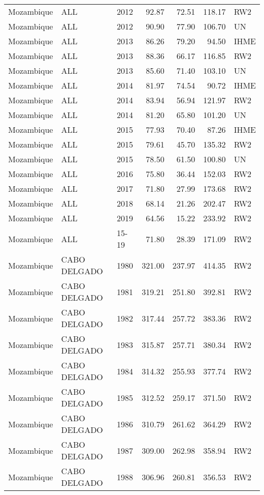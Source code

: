 \begin{longtable}{lllrrrl}
  Mozambique & ALL & 2012 & 92.87 & 72.51 & 118.17 & RW2 \\ 
  Mozambique & ALL & 2012 & 90.90 & 77.90 & 106.70 & UN \\ 
  Mozambique & ALL & 2013 & 86.26 & 79.20 & 94.50 & IHME \\ 
  Mozambique & ALL & 2013 & 88.36 & 66.17 & 116.85 & RW2 \\ 
  Mozambique & ALL & 2013 & 85.60 & 71.40 & 103.10 & UN \\ 
  Mozambique & ALL & 2014 & 81.97 & 74.54 & 90.72 & IHME \\ 
  Mozambique & ALL & 2014 & 83.94 & 56.94 & 121.97 & RW2 \\ 
  Mozambique & ALL & 2014 & 81.20 & 65.80 & 101.20 & UN \\ 
  Mozambique & ALL & 2015 & 77.93 & 70.40 & 87.26 & IHME \\ 
  Mozambique & ALL & 2015 & 79.61 & 45.70 & 135.32 & RW2 \\ 
  Mozambique & ALL & 2015 & 78.50 & 61.50 & 100.80 & UN \\ 
  Mozambique & ALL & 2016 & 75.80 & 36.44 & 152.03 & RW2 \\ 
  Mozambique & ALL & 2017 & 71.80 & 27.99 & 173.68 & RW2 \\ 
  Mozambique & ALL & 2018 & 68.14 & 21.26 & 202.47 & RW2 \\ 
  Mozambique & ALL & 2019 & 64.56 & 15.22 & 233.92 & RW2 \\ 
  Mozambique & ALL & 15-19 & 71.80 & 28.39 & 171.09 & RW2 \\ 
  Mozambique & CABO DELGADO & 1980 & 321.00 & 237.97 & 414.35 & RW2 \\ 
  Mozambique & CABO DELGADO & 1981 & 319.21 & 251.80 & 392.81 & RW2 \\ 
  Mozambique & CABO DELGADO & 1982 & 317.44 & 257.72 & 383.36 & RW2 \\ 
  Mozambique & CABO DELGADO & 1983 & 315.87 & 257.71 & 380.34 & RW2 \\ 
  Mozambique & CABO DELGADO & 1984 & 314.32 & 255.93 & 377.74 & RW2 \\ 
  Mozambique & CABO DELGADO & 1985 & 312.52 & 259.17 & 371.50 & RW2 \\ 
  Mozambique & CABO DELGADO & 1986 & 310.79 & 261.62 & 364.29 & RW2 \\ 
  Mozambique & CABO DELGADO & 1987 & 309.00 & 262.98 & 358.94 & RW2 \\ 
  Mozambique & CABO DELGADO & 1988 & 306.96 & 260.81 & 356.53 & RW2 \\ 

\end{longtable}
